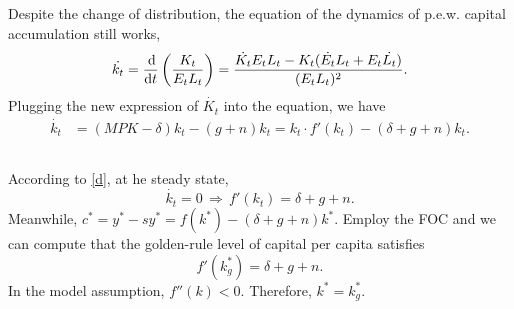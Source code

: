 \documentclass{article}
\newcommand{\kast}{k^\ast}
\begin{document}
\subsection{}
Despite the change of distribution, the equation of the dynamics of p.e.w. capital accumulation still works,
\[
    \dot{k_t} = \frac{\dif}{\dif t} \left( \frac{K_t}{E_t L_t} \right)
    = \frac{\dot{K_t} E_t L_t - K_t (\dot{E_t} L_t + E_t \dot{L_t})}{(E_t L_t)^2}.
\]
Plugging the new expression of $\dot{K_t}$ into the equation, we have
\begin{align}
    \dot{k_t} &= (MPK - \delta) k_t - (g + n) k_t
    = k_t \cdot f'(k_t) - (\delta + g + n) k_t. \label{d}
\end{align}

\subsection{}
According to \eqref{d}, at he steady state,
\[
    \dot{k_t} = 0 \,\Longrightarrow\,
    f'(k_t) = \delta + g + n.
\]
Meanwhile, $c^\ast = y^\ast - s y^\ast = f(\kast) - (\delta + g + n) \kast$. Employ the FOC and we can compute that the golden-rule level of capital per capita satisfies
\[
    f'(\kast_g) = \delta + g + n.
\]
In the model assumption, $f''(k) < 0$. Therefore, $\kast = \kast_g$.
\end{document}
